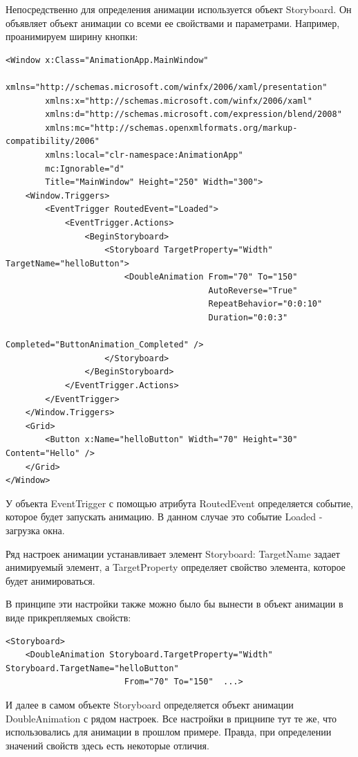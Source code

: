 Непосредственно для определения анимации используется объект Storyboard. Он объявляет объект анимации со всеми ее свойствами и параметрами. Например, проанимируем ширину кнопки:

\begin{verbatim}
<Window x:Class="AnimationApp.MainWindow"
        xmlns="http://schemas.microsoft.com/winfx/2006/xaml/presentation"
        xmlns:x="http://schemas.microsoft.com/winfx/2006/xaml"
        xmlns:d="http://schemas.microsoft.com/expression/blend/2008"
        xmlns:mc="http://schemas.openxmlformats.org/markup-compatibility/2006"
        xmlns:local="clr-namespace:AnimationApp"
        mc:Ignorable="d"
        Title="MainWindow" Height="250" Width="300">
    <Window.Triggers>
        <EventTrigger RoutedEvent="Loaded">
            <EventTrigger.Actions>
                <BeginStoryboard>
                    <Storyboard TargetProperty="Width" TargetName="helloButton">
                        <DoubleAnimation From="70" To="150"
                                         AutoReverse="True"
                                         RepeatBehavior="0:0:10"
                                         Duration="0:0:3"
                                         Completed="ButtonAnimation_Completed" />
                    </Storyboard>
                </BeginStoryboard>
            </EventTrigger.Actions>
        </EventTrigger>
    </Window.Triggers>
    <Grid>
        <Button x:Name="helloButton" Width="70" Height="30" Content="Hello" />
    </Grid>
</Window>
\end{verbatim}

У объекта EventTrigger с помощью атрибута RoutedEvent определяется событие, которое будет запускать анимацию. В данном случае это событие Loaded - загрузка окна.

Ряд настроек анимации устанавливает элемент Storyboard: TargetName задает анимируемый элемент, а TargetProperty определяет свойство элемента, которое будет анимироваться.

В принципе эти настройки также можно было бы вынести в объект анимации в виде прикрепляемых свойств:

\begin{verbatim}
<Storyboard>
    <DoubleAnimation Storyboard.TargetProperty="Width" Storyboard.TargetName="helloButton"
                        From="70" To="150"  ...>
\end{verbatim}
                        
И далее в самом объекте Storyboard определяется объект анимации DoubleAnimation с рядом настроек. Все настройки в прицнипе тут те же, что использовались для анимации в прошлом примере. Правда, при определении значений свойств здесь есть некоторые отличия.

